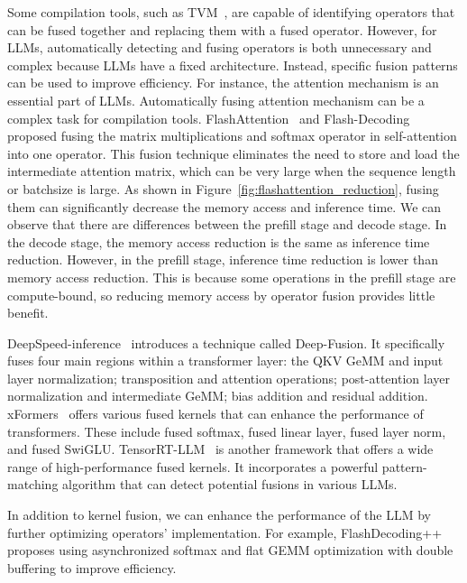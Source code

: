Some compilation tools, such as TVM~\citep{chen2018tvm}, are capable of identifying operators that can be fused together and replacing them with a fused operator. 
However, for LLMs, automatically detecting and fusing operators is both unnecessary and complex because LLMs have a fixed architecture. 
Instead, specific fusion patterns can be used to improve efficiency. 
For instance, the attention mechanism is an essential part of LLMs.
Automatically fusing attention mechanism can be a complex task for compilation tools.
FlashAttention~\citep{dao2022flashattention,dao2023flashattention2} and Flash-Decoding~\citep{dao2023flashdecoding} proposed fusing the matrix multiplications and softmax operator in self-attention into one operator.
This fusion technique eliminates the need to store and load the intermediate attention matrix, which can be very large when the sequence length or batchsize is large. 
As shown in Figure~\ref{fig:flashattention_reduction}, fusing them can significantly decrease the memory access and inference time.
We can observe that there are differences between the prefill stage and decode stage. 
In the decode stage, the memory access reduction is the same as inference time reduction. 
However, in the prefill stage, inference time reduction is lower than memory access reduction. 
This is because some operations in the prefill stage are compute-bound, so reducing memory access by operator fusion provides little benefit.

DeepSpeed-inference~\citep{aminabadi2022deepspeedinference} introduces a technique called Deep-Fusion.
It specifically fuses four main regions within a transformer layer: the QKV GeMM and input layer normalization; transposition and attention operations; post-attention layer normalization and intermediate GeMM; bias addition and residual addition.
xFormers~\citep{xFormers2022} offers various fused kernels that can enhance the performance of transformers. These include fused softmax, fused linear layer, fused layer norm, and fused SwiGLU. 
TensorRT-LLM~\citep{vaidya2023tensorrt_llm} is another framework that offers a wide range of high-performance fused kernels. It incorporates a powerful pattern-matching algorithm that can detect potential fusions in various LLMs. 

In addition to kernel fusion, we can enhance the performance of the LLM by further optimizing operators' implementation. 
For example, FlashDecoding++~\citep{hong2023flashdecoding++} proposes using asynchronized softmax and flat GEMM optimization with double buffering to improve efficiency.


